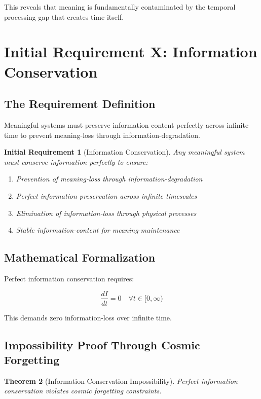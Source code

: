 \documentclass[12pt,a4paper]{article}
\newtheorem{theorem}{Theorem}[section]
\newtheorem{requirement}[theorem]{Initial Requirement}
\begin{document}
This reveals that meaning is fundamentally contaminated by the temporal processing gap that creates time itself.

\section{Initial Requirement X: Information Conservation}

\subsection{The Requirement Definition}

Meaningful systems must preserve information content perfectly across infinite time to prevent meaning-loss through information-degradation.

\begin{requirement}[Information Conservation]
Any meaningful system must conserve information perfectly to ensure:
\begin{enumerate}
\item Prevention of meaning-loss through information-degradation
\item Perfect information preservation across infinite timescales
\item Elimination of information-loss through physical processes
\item Stable information-content for meaning-maintenance
\end{enumerate}
\end{requirement}

\subsection{Mathematical Formalization}

Perfect information conservation requires:

$$\frac{dI}{dt} = 0 \quad \forall t \in [0,\infty)$$

This demands zero information-loss over infinite time.

\subsection{Impossibility Proof Through Cosmic Forgetting}

\begin{theorem}[Information Conservation Impossibility]
Perfect information conservation violates cosmic forgetting constraints.
\end{theorem}
\end{document}
